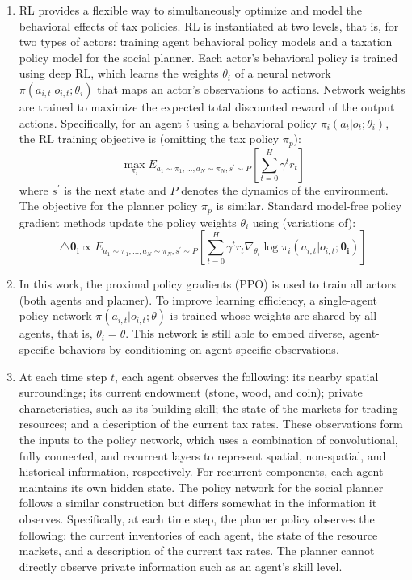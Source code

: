 \documentclass{article}
\begin{document}
\begin{enumerate}
	\item RL provides a flexible way to simultaneously optimize and model the behavioral effects of tax policies. RL is instantiated at two levels, that is, for two types of actors: training agent behavioral policy models and a taxation policy model for the social planner. Each actor’s behavioral policy is trained using deep RL, which learns the weights \( \theta_{i} \) of a neural network \( \pi(a_{i, t} | o_{i, t}; \theta_{i}) \) that maps an actor’s observations to actions. Network weights are trained to maximize the expected total discounted reward of the output actions. Specifically, for an agent \( i \) using a behavioral policy \( \pi_{i}(a_{t} | o_{t}; \theta_{i}) \), the RL training objective is (omitting the tax policy \( \pi_{p} \)):
	\begin{equation}\label{Equation5}
		\max_{\pi_{i}} E_{a_{1} \sim \pi_{1}, ..., a_{N} \sim \pi_{N}, s^{'} \sim P} [\sum^{H}_{t = 0} \gamma^{t} r_{t}]
	\end{equation}
	where \( s^{'} \) is the next state and \( P \) denotes the dynamics of the environment. The objective for the planner policy \( \pi_{p} \) is similar. Standard model-free policy gradient methods update the policy weights \( \theta_{i} \) using (variations of):
	\begin{equation}\label{Equation6}
		\mathbf{\triangle \theta_{i}} \propto E_{{a_{1} \sim \pi_{1}, ..., a_{N} \sim \pi_{N}, s^{'} \sim P}}[\sum^{H}_{t = 0} \gamma^{t} r_{t} \nabla_{\theta_{i}} \log \pi_{i}(a_{i, t} | o_{i, t}; \mathbf{\theta_{i}})]
	\end{equation}

	\item In this work, the proximal policy gradients (PPO) is used to train all actors (both agents and planner). To improve learning efficiency, a single-agent policy network \( \pi(a_{i, t} | o_{i, t}; \theta) \) is trained whose weights are shared by all agents, that is, \( \theta_{i} = \theta \). This network is still able to embed diverse, agent-specific behaviors by conditioning on agent-specific observations.
	
	\item At each time step \( t \), each agent observes the following: its nearby spatial surroundings; its current endowment (stone, wood, and coin); private characteristics, such as its building skill; the state of the markets for trading resources; and a description of the current tax rates. These observations form the inputs to the policy network, which uses a combination of convolutional, fully connected, and recurrent layers to represent spatial, non-spatial, and historical information, respectively. For recurrent components, each agent maintains its own hidden state. The policy network for the social planner follows a similar construction but differs somewhat in the information it observes. Specifically, at each time step, the planner policy observes the following: the current inventories of each agent, the state of the resource markets, and a description of the current tax rates. The planner cannot directly observe private information such as an agent’s skill level.
	

\end{enumerate}
\end{document}
